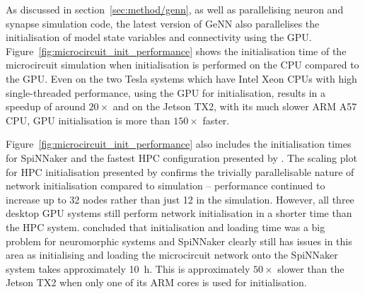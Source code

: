 \documentclass[utf8]{frontiersSCNS} %
\begin{document}
As discussed in section~\ref{sec:method/genn}, as well as parallelising neuron and synapse simulation code, the latest version of GeNN also parallelises the initialisation of model state variables and connectivity using the GPU.
Figure~\ref{fig:microcircuit_init_performance} shows the initialisation time of the microcircuit simulation when initialisation is performed on the CPU compared to the GPU.
Even on the two Tesla systems which have Intel Xeon CPUs with high single-threaded performance, using the GPU for initialisation, results in a speedup of around $20\times$ and on the Jetson TX2, with its much slower ARM A57 CPU, GPU initialisation is more than $150\times$ faster.

Figure~\ref{fig:microcircuit_init_performance} also includes the initialisation times for SpiNNaker and the fastest HPC configuration presented by \citet{VanAlbada2018}.
The scaling plot for HPC initialisation presented by \citeauthor{VanAlbada2018} confirms the trivially parallelisable nature of network initialisation compared to simulation -- performance continued to increase up to 32 nodes rather than just 12 in the simulation.
However, all three desktop GPU systems still perform network initialisation in a shorter time than the HPC system.
\citet{Diamond2018} concluded that initialisation and loading time was a big problem for neuromorphic systems and SpiNNaker clearly still has issues in this area as initialising and loading the microcircuit network onto the SpiNNaker system takes approximately \SI{10}{\hour}.
This is approximately $50\times$ slower than the Jetson TX2 when only one of its ARM cores is used for initialisation.
\end{document}
